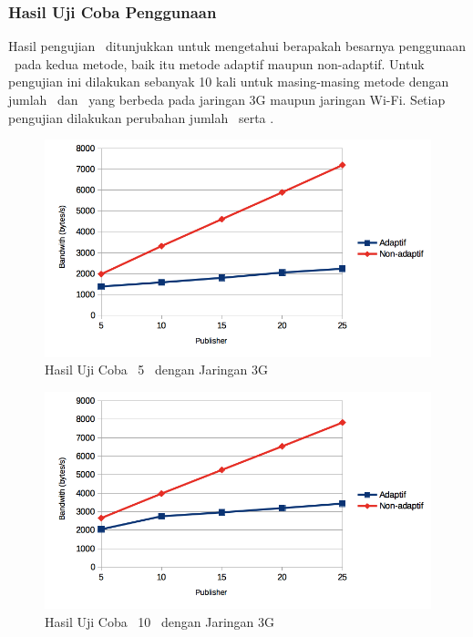 
\subsubsection{Hasil Uji Coba Penggunaan \bandwidth}

Hasil pengujian \bandwidth~ditunjukkan untuk mengetahui berapakah besarnya
penggunaan \bandwidth~pada kedua metode, baik itu metode adaptif maupun
non-adaptif.  Untuk pengujian ini dilakukan sebanyak 10 kali untuk masing-masing
metode dengan jumlah \publisher~dan \subscriber~yang berbeda pada jaringan 3G
maupun jaringan Wi-Fi. Setiap pengujian dilakukan perubahan jumlah
\publiser~serta \subscriber.

\noindent
\begin{figure}
  \centering
  \includegraphics[scale=0.90]
	{images/4-3gbandwidth5.png}
	\caption{Hasil Uji Coba \Bandwidth~5 \Subscriber~dengan Jaringan 3G}
\label{fig:3gbandwidth_5}
\end{figure}
\noindent

\begin{figure}
  \centering
  \includegraphics[scale=0.90]
	{images/4-3gbandwidth10.png}
	\caption{Hasil Uji Coba \Bandwidth~10 \Subscriber~dengan Jaringan 3G}
\label{fig:3gbandwidth_10}
\end{figure}

